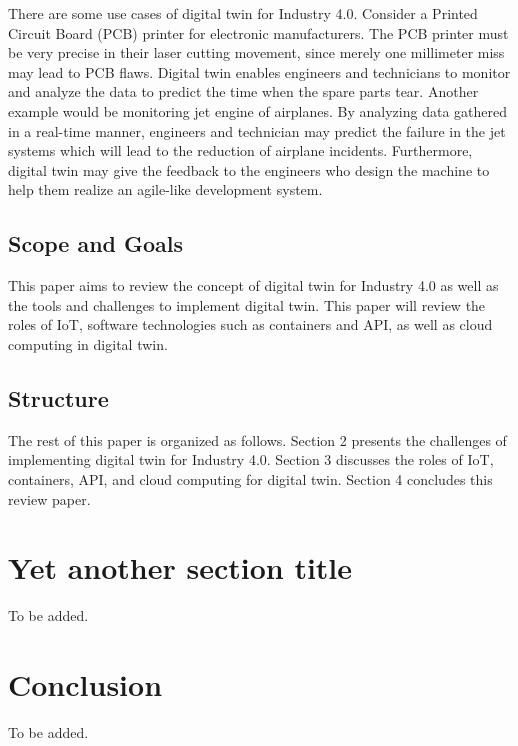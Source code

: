 \documentclass[article]{aaltoseries}
\begin{document}
There are some use cases of digital twin for Industry 4.0. Consider a Printed Circuit Board (PCB) printer for electronic manufacturers. The PCB printer must be very precise in their laser cutting movement, since merely one millimeter miss may lead to PCB flaws. Digital twin enables engineers and technicians to monitor and analyze the data to predict the time when the spare parts tear. Another example would be monitoring jet engine of airplanes. By analyzing data gathered in a real-time manner, engineers and technician may predict the failure in the jet systems which will lead to the reduction of airplane incidents. Furthermore, digital twin may give the feedback to the engineers who design the machine to help them realize an agile-like development system.

\subsection{Scope and Goals}
This paper aims to review the concept of digital twin for Industry 4.0 as well as the tools and challenges to implement digital twin. This paper will review the roles of IoT, software technologies such as containers and API, as well as cloud computing in digital twin.

\subsection{Structure}
The rest of this paper is organized as follows. Section 2 presents the challenges of implementing digital twin for Industry 4.0. Section 3 discusses the roles of IoT, containers, API, and cloud computing for digital twin. Section 4 concludes this review paper.
 









\section{Yet another section title}

To be added.




\section{Conclusion}

To be added.






\end{document}
